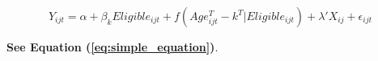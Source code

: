 \documentclass{article}%
\begin{document}

    \begin{equation}%
        \label{eq:simple_equation}%
        Y_{ijt} = \alpha + \beta_kEligible_{ijt} + f (Age^T_{ijt}-k^T | 
        Eligible_{ijt}) + \lambda'X_{ij} + \epsilon_{ijt}
    \end{equation}

\blindtext \textbf{See Equation (\ref{eq:simple_equation})}.
\end{document}
